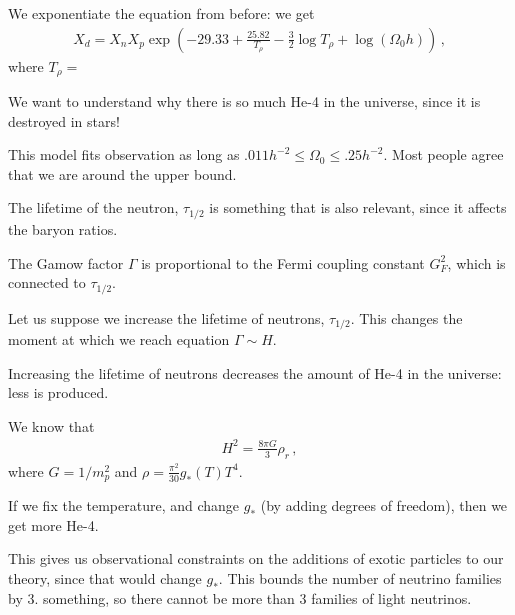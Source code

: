 \documentclass[main.tex]{subfiles}
\begin{document}

We exponentiate the equation from before: 
we get 
%
\begin{align}
  X_d = X_n X_p
  \exp(-29.33 + \frac{25.82}{T_\rho  } - \frac{3}{2} \log T_\rho + \log ( \Omega_0 h ))
\,,
\end{align}
%
where \(T_\rho  = \) 

We want to understand why there is so much He-4 in the universe, since it is destroyed in stars! 

This model fits observation as long as \(\num{.011} h^{-2}\leq \Omega_0 \leq \num{.25} h^{-2}\). 
Most people agree that we are around the upper bound. 


The lifetime of the neutron, \(\tau_{1/2}\) is something that is also relevant, since it affects the baryon ratios. 

The Gamow factor \(\Gamma \) is proportional to the Fermi coupling constant \(G_F^2\), which is connected to \(\tau_{1/2}\). 

Let us suppose we increase the lifetime of neutrons, \(\tau_{1/2}\). 
This changes the moment at which we reach equation \(\Gamma \sim H\). 

Increasing the lifetime of neutrons decreases the amount of He-4 in the universe: less is produced. 

We know that 
%
\begin{align}
  H^2 = \frac{8 \pi G}{3} \rho_r
\,,
\end{align}
%
where \(G = 1 / m_p^2\) and \(\rho = \frac{\pi^2}{30} g_{*}(T) T^4\).

If we fix the temperature, and change \(g_{*}\) (by adding degrees of freedom), then we get more He-4. 

This gives us observational constraints on the additions of exotic particles to our theory, since that would change \(g_{*}\). 
This bounds the number of neutrino families by \num{3.} something, so there cannot be more than \num{3} families of light neutrinos. 
\end{document}
